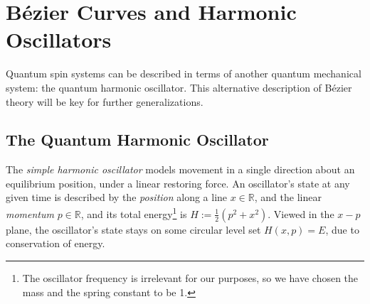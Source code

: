 \documentclass[12pt,final,3p]{elsarticle}
\begin{document}
\section{B\'{e}zier Curves and Harmonic Oscillators}\label{sec:bezier_osc}
Quantum spin systems can be described in terms of another quantum mechanical system: the quantum harmonic oscillator. This alternative description of B\'{e}zier theory will be key for further generalizations.

\subsection{The Quantum Harmonic Oscillator}
The \emph{simple harmonic oscillator} models movement in a single direction about an equilibrium position, under a linear restoring force. An oscillator's state at any given time is described by the \emph{position} along a line $x \in \mathbb{R}$, and the linear \emph{momentum} $p \in \mathbb{R}$, and its total energy\footnote{The oscillator frequency is irrelevant for our purposes, so we have chosen the mass and the spring constant to be 1.} is $H := \frac{1}{2}(p^{2} + x^{2})$. Viewed in the $x-p$ plane, the oscillator's state stays on some circular level set $H(x,p) = E$, due to conservation of energy.
\end{document}

